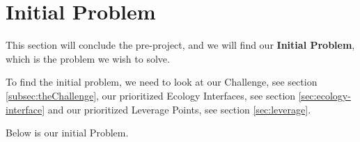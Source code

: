 \section{Initial Problem}
This section will conclude the pre-project, and we will find our \textbf{Initial Problem}, which is the problem we wish to solve.

To find the initial problem, we need to look at our Challenge, see section \ref{subsec:theChallenge}, our prioritized Ecology Interfaces, see section \ref{sec:ecology-interface} and our prioritized Leverage Points, see section \ref{sec:leverage}.

Below is our initial Problem.

\noindent\hrulefill\par
\noindent{} \\



